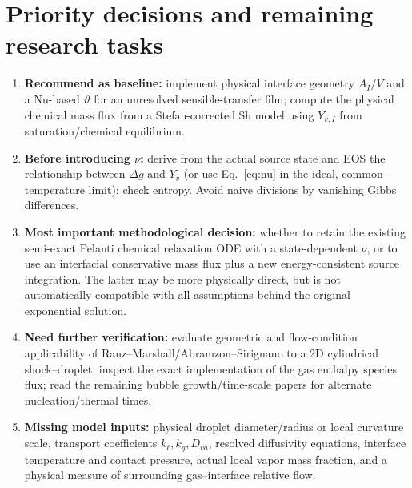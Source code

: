 \documentclass[11pt,letterpaper]{article}
\begin{document}
\section{Priority decisions and remaining research tasks}
\begin{enumerate}
\item \textbf{Recommend as baseline:} implement physical interface geometry $A_I/V$ and a Nu-based $\vartheta$ for an unresolved sensible-transfer film; compute the physical chemical mass flux from a Stefan-corrected Sh model using $Y_{v,I}$ from saturation/chemical equilibrium.
\item \textbf{Before introducing $\nu$:} derive from the actual source state and EOS the relationship between $\Delta g$ and $Y_v$ (or use Eq.~\eqref{eq:nu} in the ideal, common-temperature limit); check entropy. Avoid naive divisions by vanishing Gibbs differences.
\item \textbf{Most important methodological decision:} whether to retain the existing semi-exact Pelanti chemical relaxation ODE with a state-dependent $\nu$, or to use an interfacial conservative mass flux plus a new energy-consistent source integration. The latter may be more physically direct, but is not automatically compatible with all assumptions behind the original exponential solution.
\item \textbf{Need further verification:} evaluate geometric and flow-condition applicability of Ranz--Marshall/Abramzon--Sirignano to a 2D cylindrical shock--droplet; inspect the exact implementation of the gas enthalpy species flux; read the remaining bubble growth/time-scale papers for alternate nucleation/thermal times.
\item \textbf{Missing model inputs:} physical droplet diameter/radius or local curvature scale, transport coefficients $k_\ell,k_g,D_{va}$, resolved diffusivity equations, interface temperature and contact pressure, actual local vapor mass fraction, and a physical measure of surrounding gas--interface relative flow.
\end{enumerate}
\end{document}
